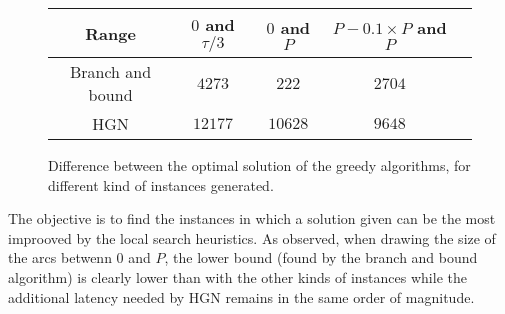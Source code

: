 \begin{center}
\begin{figure}
\centering
\begin{tabular}{ |c|c|c|c|c| }
\hline
    Range & $0$ and $\tau/3$ & $0$ and $P$& $P-0.1\times P$ and $P$\\
    \hline
    Branch and bound & $4273$ & $222$& $2704$ \\
 
    HGN & $12177$ & $10628$& $9648$\\
   
    \hline
  
 \end{tabular} 
 \caption{Difference between the optimal solution of the greedy algorithms, for different kind of instances generated.}
 \label{tab:instances}
 \end{figure}
 \end{center}
 The objective is to find the instances in which a solution given can be the most improoved by the local search heuristics. As observed, when drawing the size of the arcs betwenn $0$ and $P$, the lower bound (found by the branch and bound algorithm) is clearly lower than with the other kinds of instances while the additional latency needed by HGN remains in the same order of magnitude.
 